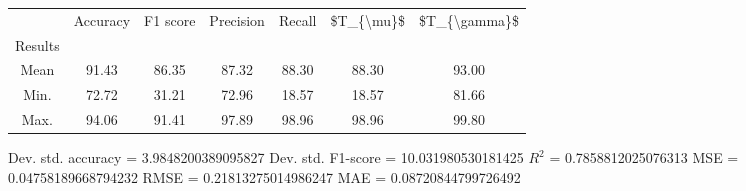 \begin{tabular}{|c|c|c|c|c|c|c|}
\toprule
{} &  Accuracy &  F1 score &  Precision &  Recall &  \$T\_\{\textbackslash mu\}\$ &  \$T\_\{\textbackslash gamma\}\$ \\
Results &           &           &            &         &            &               \\
\hline
Mean    &     91.43 &     86.35 &      87.32 &   88.30 &      88.30 &         93.00 \\
Min.    &     72.72 &     31.21 &      72.96 &   18.57 &      18.57 &         81.66 \\
Max.    &     94.06 &     91.41 &      97.89 &   98.96 &      98.96 &         99.80 \\
\bottomrule
\end{tabular}

 Dev. std. accuracy = 3.9848200389095827
 Dev. std. F1-score = 10.031980530181425
 $R^2$ = 0.7858812025076313
 MSE = 0.04758189668794232
 RMSE = 0.21813275014986247
 MAE = 0.08720844799726492